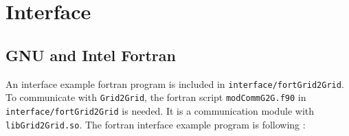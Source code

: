 \pagebreak
	\section{Interface}
	\label{chap:interfaceLang}

		\subsection{GNU and Intel Fortran}

		An interface example fortran program is included in \texttt{interface/fortGrid2Grid}. To communicate with \texttt{Grid2Grid}, the fortran script \texttt{modCommG2G.f90} in \texttt{interface/}\texttt{fortGrid2Grid} is needed. It is a communication module with \texttt{libGrid2Grid.so}. The fortran interface example program is following :

